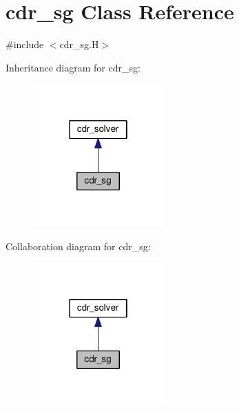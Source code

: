 \hypertarget{classcdr__sg}{}\section{cdr\+\_\+sg Class Reference}
\label{classcdr__sg}


{\ttfamily \#include $<$cdr\+\_\+sg.\+H$>$}



Inheritance diagram for cdr\+\_\+sg\+:\nopagebreak
\begin{figure}[H]
\begin{center}
\leavevmode
\includegraphics[width=142pt]{classcdr__sg__inherit__graph}
\end{center}
\end{figure}


Collaboration diagram for cdr\+\_\+sg\+:\nopagebreak
\begin{figure}[H]
\begin{center}
\leavevmode
\includegraphics[width=142pt]{classcdr__sg__coll__graph}
\end{center}
\end{figure}
